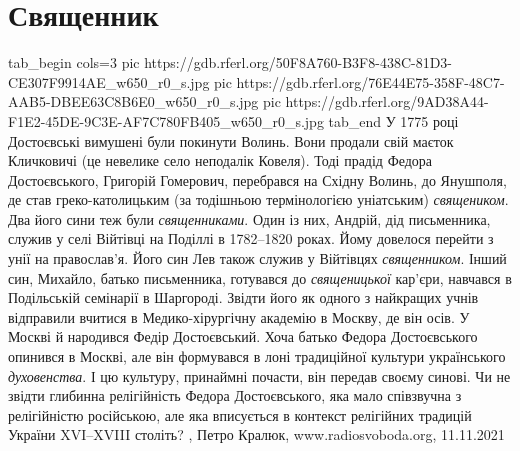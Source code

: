  
 
 
 
 
\chapter{Священник}

\ifcmt
  tab_begin cols=3
     pic https://gdb.rferl.org/50F8A760-B3F8-438C-81D3-CE307F9914AE_w650_r0_s.jpg
     pic https://gdb.rferl.org/76E44E75-358F-48C7-AAB5-DBEE63C8B6E0_w650_r0_s.jpg
		 pic https://gdb.rferl.org/9AD38A44-F1E2-45DE-9C3E-AF7C780FB405_w650_r0_s.jpg
  tab_end
\fi
У 1775 році Достоєвські вимушені були покинути Волинь. Вони продали свій маєток
Кличковичі (це невелике село неподалік Ковеля).  Тоді прадід Федора
Достоєвського, Григорій Гомерович, перебрався на Східну Волинь, до Янушполя, де
став греко-католицьким (за тодішньою термінологією уніатським) \emph{священиком}. Два
його сини теж були \emph{священниками}. Один із них, Андрій, дід письменника, служив у
селі Війтівці на Поділлі в 1782–1820 роках.  Йому довелося перейти з унії на
православ’я. Його син Лев також служив у Війтівцях \emph{священником}. Інший син,
Михайло, батько письменника, готувався до \emph{священицької} кар’єри, навчався в
Подільській семінарії в Шаргороді. Звідти його як одного з найкращих учнів
відправили вчитися в Медико-хірургічну академію в Москву, де він осів. У Москві
й народився Федір Достоєвський. Хоча батько Федора Достоєвського опинився в
Москві, але він формувався в лоні традиційної культури українського
\emph{духовенства}. І цю культуру, принаймні почасти, він передав своєму синові. Чи не
звідти глибинна релігійність Федора Достоєвського, яка мало співзвучна з
релігійністю російською, але яка вписується в контекст релігійних традицій
України XVI–XVIII століть?
, 
Петро Кралюк, www.radiosvoboda.org, 11.11.2021

